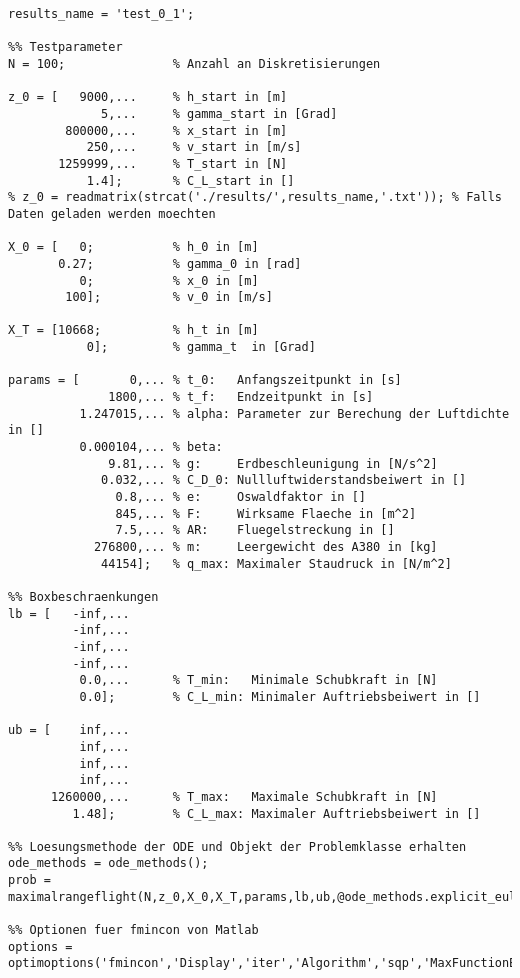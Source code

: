 \begin{lstlisting}[style=num_octave, caption={Matlab Programmcode von Versuchsskript \texttt{test\_0\_1.m}.}, label=code:direct_test_0_1]
%% Speicher Parameter
results_name = 'test_0_1';

%% Testparameter
N = 100;               % Anzahl an Diskretisierungen

z_0 = [   9000,...     % h_start in [m]
             5,...     % gamma_start in [Grad]  
        800000,...     % x_start in [m]
           250,...     % v_start in [m/s]
       1259999,...     % T_start in [N]
           1.4];       % C_L_start in []
% z_0 = readmatrix(strcat('./results/',results_name,'.txt')); % Falls Daten geladen werden moechten     

X_0 = [   0;           % h_0 in [m]
       0.27;           % gamma_0 in [rad]
          0;           % x_0 in [m]
        100];          % v_0 in [m/s]

X_T = [10668;          % h_t in [m]
           0];         % gamma_t  in [Grad]

params = [       0,... % t_0:   Anfangszeitpunkt in [s]
              1800,... % t_f:   Endzeitpunkt in [s]
          1.247015,... % alpha: Parameter zur Berechung der Luftdichte in []
          0.000104,... % beta: 
              9.81,... % g:     Erdbeschleunigung in [N/s^2]
             0.032,... % C_D_0: Nullluftwiderstandsbeiwert in []
               0.8,... % e:     Oswaldfaktor in []
               845,... % F:     Wirksame Flaeche in [m^2]
               7.5,... % AR:    Fluegelstreckung in []
            276800,... % m:     Leergewicht des A380 in [kg]
             44154];   % q_max: Maximaler Staudruck in [N/m^2]  

%% Boxbeschraenkungen
lb = [   -inf,...
         -inf,...
         -inf,...
         -inf,...
          0.0,...      % T_min:   Minimale Schubkraft in [N]
          0.0];        % C_L_min: Minimaler Auftriebsbeiwert in []
      
ub = [    inf,...
          inf,...
          inf,...
          inf,...
      1260000,...      % T_max:   Maximale Schubkraft in [N]
         1.48];        % C_L_max: Maximaler Auftriebsbeiwert in []

%% Loesungsmethode der ODE und Objekt der Problemklasse erhalten
ode_methods = ode_methods();
prob = maximalrangeflight(N,z_0,X_0,X_T,params,lb,ub,@ode_methods.explicit_euler);

%% Optionen fuer fmincon von Matlab
options = optimoptions('fmincon','Display','iter','Algorithm','sqp','MaxFunctionEvaluations',2000.0e+03,'MaxIterations',4.0e+05);
\end{lstlisting}


